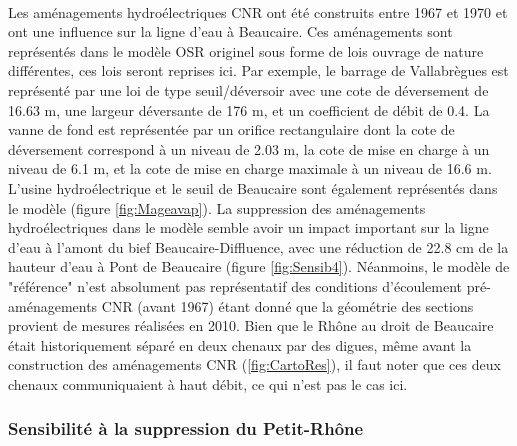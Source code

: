 \documentclass[11pt]{article}
\begin{document}
		\paragraph{} Les aménagements hydroélectriques CNR ont été construits entre 1967 et 1970 et ont une influence sur la ligne d'eau à Beaucaire. Ces aménagements sont représentés dans le modèle OSR originel \citep{launay_zabr-osr_2017} sous forme de lois ouvrage de nature différentes, ces lois seront reprises ici. Par exemple, le barrage de Vallabrègues est représenté par une loi de type seuil/déversoir avec une cote de déversement de 16.63 m, une largeur déversante de 176 m, et un coefficient de débit de 0.4. La vanne de fond est représentée par un orifice rectangulaire dont la cote de déversement correspond à un niveau de 2.03 m, la cote de mise en charge à un niveau de 6.1 m, et la cote de mise en charge maximale à un niveau de 16.6 m. L'usine hydroélectrique et le seuil de Beaucaire sont également représentés dans le modèle (figure \ref{fig:Mageavap}). La suppression des aménagements hydroélectriques dans le modèle semble avoir un impact important sur la ligne d'eau à l'amont du bief Beaucaire-Diffluence, avec une réduction de 22.8 cm de la hauteur d'eau à Pont de Beaucaire (figure \ref{fig:Sensib4}). Néanmoins, le modèle de "référence" n'est absolument pas représentatif des conditions d'écoulement pré-aménagements CNR (avant 1967) étant donné que la géométrie des sections provient de mesures réalisées en 2010. Bien que le Rhône au droit de Beaucaire était historiquement séparé en deux chenaux par des digues, même avant la construction des aménagements CNR (\ref{fig:CartoRes}), il faut noter que ces deux chenaux communiquaient à haut débit, ce qui n'est pas le cas ici. 
	
	\subsubsection{Sensibilité à la suppression du Petit-Rhône} 
	
\end{document}

